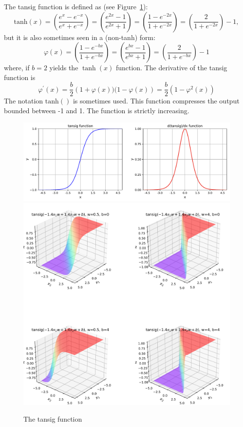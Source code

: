 The tansig function is defined as (see Figure~\ref{fig:tansig}):
\begin{equation}
\textrm{tanh}(x)
=\left(\frac{e^{x}-e^{-x}}{e^{x}+e^{-x}}\right)
=\left(\frac{e^{2x}-1}{e^{2x}+1}\right)
=\left(\frac{1-e^{-2x}}{1+e^{-2x}}\right)
=\left(\frac{2}{1+e^{-2x}}\right)-1,
\end{equation}  
but it is also sometimes seen in a (non-tanh) form:
\begin{equation}
\varphi(x)
=\left(\frac{1-e^{-bx}}{1+e^{-bx}}\right)
=\left(\frac{e^{bx}-1}{e^{bx}+1}\right)
=\left(\frac{2}{1+e^{-bx}}\right)-1
\end{equation}  
where, if $b=2$ yields the $\tanh(x)$ function.
The derivative of the tansig function is 
\begin{equation}
 \varphi^\prime(x)
 = \frac{b}{2} \left(1+\varphi(x))(1-\varphi(x)\right)
 = \frac{b}{2}\left(1-\varphi^2(x)\right)
\end{equation}
The notation $\textrm{tanh}()$ is sometimes used.
This function compresses the output bounded between -1 and 1. The function is strictly increasing. 



\begin{figure}[p]
\centering
\includegraphics[width=\textwidth]{pic/tansig01}
\includegraphics[width=\textwidth]{pic/tansig02}
\caption{The tansig function \label{fig:tansig}}
\end{figure}



